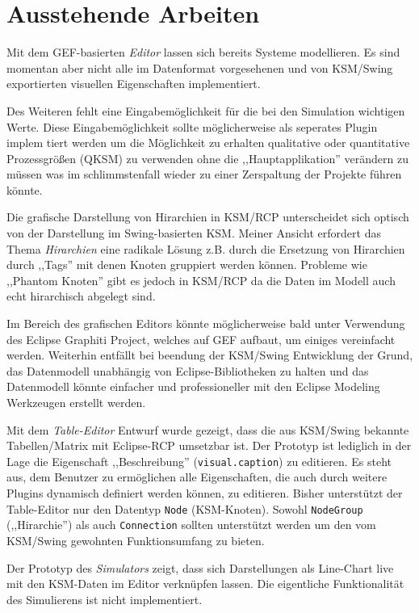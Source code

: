 \documentclass[%
12pt,titlepage,abstracton,DIV=10,BCOR=0.5cm]{scrreprt}
\begin{document}
\section{Ausstehende Arbeiten}
Mit dem GEF-basierten \emph{Editor} lassen sich bereits Systeme modellieren. Es
sind momentan aber nicht alle im Datenformat vorgesehenen und von KSM/Swing
exportierten visuellen Eigenschaften implementiert.

Des Weiteren fehlt eine Eingabemöglichkeit für die bei den Simulation wichtigen
Werte. Diese Eingabemöglichkeit sollte möglicherweise als seperates Plugin
implem tiert werden um die Möglichkeit zu erhalten qualitative oder quantitative
Prozessgrößen (QKSM) zu verwenden ohne die ,,Hauptapplikation'' verändern zu
müssen was im schlimmstenfall wieder zu einer Zerspaltung der Projekte führen
könnte.

Die grafische Darstellung von Hirarchien in KSM/RCP unterscheidet sich optisch
von der Darstellung im Swing-basierten KSM. Meiner Ansicht erfordert das Thema
\textit{Hirarchien} eine radikale Lösung z.B. durch die Ersetzung von Hirarchien
durch ,,Tags'' mit denen Knoten gruppiert werden können. Probleme wie ,,Phantom
Knoten''\cite[S. 49]{pustelnik10} gibt es jedoch in KSM/RCP da die Daten im
Modell auch echt hirarchisch abgelegt sind.

Im Bereich des grafischen Editors könnte möglicherweise bald unter Verwendung
des Eclipse Graphiti Project, welches auf GEF aufbaut, um einiges vereinfacht
werden. Weiterhin entfällt bei beendung der KSM/Swing Entwicklung der Grund, das
Datenmodell unabhängig von Eclipse-Bibliotheken zu halten und das Datenmodell
könnte einfacher und professioneller mit den Eclipse Modeling Werkzeugen
erstellt werden.

Mit dem \emph{Table-Editor} Entwurf wurde gezeigt, dass die aus KSM/Swing
bekannte Tabellen/Matrix mit Eclipse-RCP umsetzbar ist. Der Prototyp ist lediglich in der
Lage die Eigenschaft ,,Beschreibung'' (\texttt{visual.caption}) zu editieren. Es
steht aus, dem Benutzer zu ermöglichen alle Eigenschaften, die auch durch
weitere Plugins dynamisch definiert werden können, zu editieren.
Bisher unterstützt der Table-Editor nur den Datentyp \texttt{Node} (KSM-Knoten).
Sowohl \texttt{NodeGroup} (,,Hirarchie'') als auch \texttt{Connection} sollten
unterstützt werden um den vom KSM/Swing gewohnten Funktionsumfang zu bieten.

Der Prototyp des \emph{Simulators} zeigt, dass sich Darstellungen als Line-Chart
live mit den KSM-Daten im Editor verknüpfen lassen. Die eigentliche Funktionalität
des Simulierens ist nicht implementiert.
\end{document}
